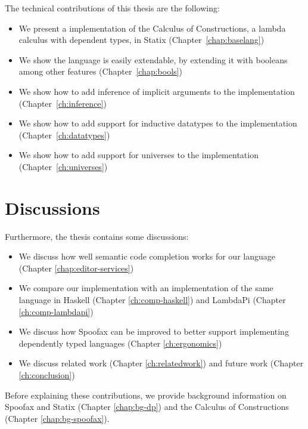 The technical contributions of this thesis are the following:
\begin{itemize}
	\item We present a implementation of the Calculus of Constructions, a lambda calculus with dependent types, in Statix (Chapter~\ref{chap:baselang})
	\item We show the language is easily extendable, by extending it with booleans among other features (Chapter~\ref{chap:bools})
	\item We show how to add inference of implicit arguments to the implementation (Chapter~\ref{ch:inference})
	\item We show how to add support for inductive datatypes to the implementation (Chapter~\ref{ch:datatypes})
	\item We show how to add support for universes to the implementation (Chapter~\ref{ch:universes})
\end{itemize}

\section*{Discussions}

Furthermore, the thesis contains some discussions:
\begin{itemize}
	\item We discuss how well semantic code completion works for our language (Chapter \ref{chap:editor-services})
	\item We compare our implementation with an implementation of the same language in Haskell (Chapter \ref{ch:comp-haskell}) and LambdaPi (Chapter \ref{ch:comp-lambdapi})
	\item We discuss how Spoofax can be improved to better support implementing dependently typed languages (Chapter \ref{ch:ergonomics})
	\item We discuss related work (Chapter \ref{ch:relatedwork}) and future work (Chapter \ref{ch:conclusion})
\end{itemize}

Before explaining these contributions, we provide background information on Spoofax and Statix (Chapter \ref{chap:bg-dp}) and the Calculus of Constructions (Chapter \ref{chap:bg-spoofax}).


